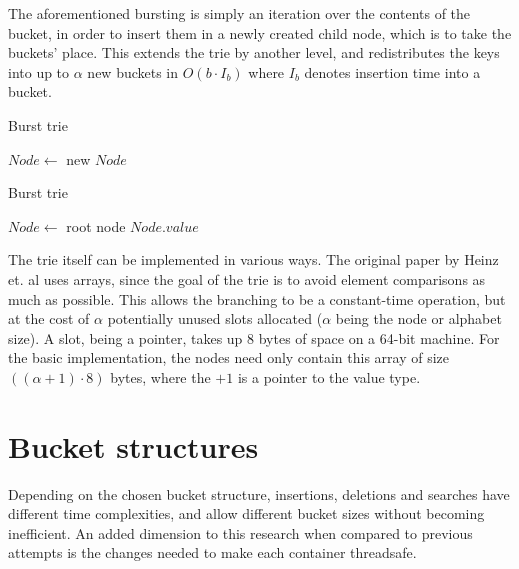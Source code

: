The aforementioned bursting is simply an iteration over the contents of the
bucket, in order to insert them in a newly created child node, which is to
take the buckets' place. This extends the trie by another level, and redistributes
the keys into up to $\alpha$ new buckets in $O(b \cdot I_b)$ where $I_b$ denotes
insertion time into a bucket.

\begin{algorithm}[H]
    \caption{Burst trie }
    \label{alg:bt_burst}
    $Node \leftarrow$ new $Node$\;
\end{algorithm}

\begin{algorithm}[H]
    \caption{Burst trie }
    \label{alg:bt_search}

    $Node \leftarrow$  root node\;
    \Return $Node.value$\;
\end{algorithm}

The trie itself can be implemented in various ways. The original paper by Heinz
et. al \cite{Heinz:2002} uses arrays, since the goal of the trie is to avoid
element comparisons as much as possible. This allows the branching to be a
constant-time operation, but at the cost of $\alpha$ potentially unused slots
allocated ($\alpha$ being the node or alphabet size). A slot, being a pointer,
takes up 8 bytes of space on a 64-bit machine.
For the basic implementation, the nodes need only contain this array of size
$((\alpha+1) \cdot 8)$ bytes, where the $+1$ is a pointer to the value type.


\section{Bucket structures}
Depending on the chosen bucket structure, insertions, deletions and searches
have different time complexities, and allow different bucket sizes without
becoming inefficient. An added dimension to this research when compared to
previous attempts is the changes needed to make each container threadsafe.

